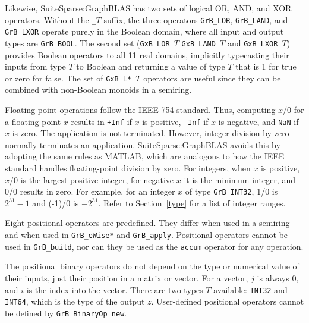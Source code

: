 \documentclass[12pt]{article}
\begin{document}
Likewise, SuiteSparse:GraphBLAS has two sets of logical OR, AND, and XOR
operators.  Without the \verb'_'$T$ suffix, the three operators \verb'GrB_LOR',
\verb'GrB_LAND', and \verb'GrB_LXOR' operate purely in the Boolean domain,
where all input and output types are \verb'GrB_BOOL'.  The second set
(\verb'GxB_LOR_'$T$ \verb'GxB_LAND_'$T$ and \verb'GxB_LXOR_'$T$) provides
Boolean operators to all 11 real domains, implicitly typecasting their inputs from
type $T$ to Boolean and returning a value of type $T$ that is 1 for true or
zero for false.  The set of \verb'GxB_L*_'$T$ operators are useful since they
can be combined with non-Boolean monoids in a semiring.

Floating-point operations follow the IEEE 754 standard.  Thus, computing $x/0$
for a floating-point $x$ results in \verb'+Inf' if $x$ is positive, \verb'-Inf'
if $x$ is negative, and \verb'NaN' if $x$ is zero.  The application is not
terminated.  However, integer division by zero normally terminates an
application.  SuiteSparse:GraphBLAS avoids this by adopting the same rules as
MATLAB, which are analogous to how the IEEE standard handles floating-point
division by zero.  For integers, when $x$ is positive, $x/0$ is the largest
positive integer, for negative $x$ it is the minimum integer, and 0/0 results
in zero.  For example, for an integer $x$ of type \verb'GrB_INT32', 1/0 is
$2^{31}-1$ and (-1)/0 is $-2^{31}$.  Refer to Section~\ref{type} for a list of
integer ranges.

Eight positional operators are predefined.  They differ when used in a semiring
and when used in \verb'GrB_eWise*' and \verb'GrB_apply'.  Positional operators
cannot be used in \verb'GrB_build', nor can they be used as the \verb'accum'
operator for any operation.

The positional binary operators do not depend on the type or numerical value of
their inputs, just their position in a matrix or vector.  For a vector, $j$ is
always 0, and $i$ is the index into the vector.  There are two types $T$
available: \verb'INT32' and \verb'INT64', which is the type of the output $z$.
User-defined positional operators cannot be defined by \verb'GrB_BinaryOp_new'.
\end{document}
